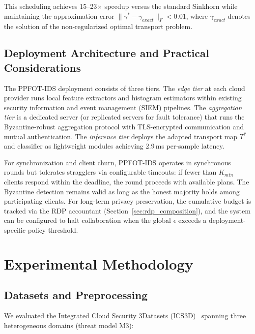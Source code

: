 \documentclass{ieeeaccess}
\theoremstyle{plain}
\theoremstyle{definition}
\theoremstyle{remark}
\begin{document}
This scheduling achieves 15--23$\times$ speedup versus the standard Sinkhorn while maintaining the approximation error $\|\gamma^* - \gamma_{exact}\|_F < 0.01$, where $\gamma_{exact}$ denotes the solution of the non-regularized optimal transport problem.

\subsection{Deployment Architecture and Practical Considerations}
\label{sec:deployment}

The PPFOT-IDS deployment consists of three tiers. The \textit{edge tier} at each cloud provider runs local feature extractors and histogram estimators within existing security information and event management (SIEM) pipelines. The \textit{aggregation tier} is a dedicated server (or replicated servers for fault tolerance) that runs the Byzantine-robust aggregation protocol with TLS-encrypted communication and mutual authentication. The \textit{inference tier} deploys the adapted transport map $T^*$ and classifier as lightweight modules achieving 2.9\,ms per-sample latency.

For synchronization and client churn, PPFOT-IDS operates in synchronous rounds but tolerates stragglers via configurable timeouts: if fewer than $K_{min}$ clients respond within the deadline, the round proceeds with available plans. The Byzantine detection remains valid as long as the honest majority holds among participating clients. For long-term privacy preservation, the cumulative budget is tracked via the RDP accountant (Section~\ref{sec:rdp_composition}), and the system can be configured to halt collaboration when the global $\epsilon$ exceeds a deployment-specific policy threshold.


\section{Experimental Methodology}
\label{sec:methodology}

\subsection{Datasets and Preprocessing}

We evaluated the Integrated Cloud Security 3Datasets (ICS3D)~\cite{anaedevha2024} spanning three heterogeneous domains (threat model M3):
\end{document}
